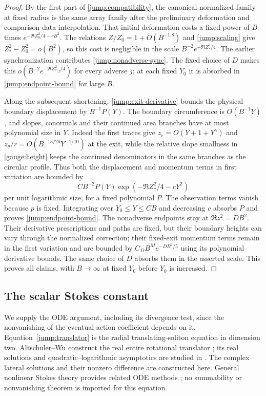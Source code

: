 \begin{proof}
By the first part of \cref{jump:compatibility}, the canonical
normalized family at fixed radius is the same array family after
the preliminary deformation and comparison-data interpolation.
That initial deformation costs a fixed power of $B$ times
$e^{-\Re Z_0^2/4-cB^2}$.  The relations
$Z/Z_0=1+O(B^{-1.8})$ and \eqref{jump:scaling} give
$Z_*^2-Z_0^2=o(B^2)$, so this cost is negligible in the
scale $B^{-2}e^{-\Re Z_*^2/4}$.
The earlier synchronization contributes
\eqref{jump:nonadverse-sync}.  The fixed choice of $D$ makes this
$o(B^{-2}e^{-\Re Z_{*,j}^2/4})$ for every adverse $j$; at each fixed
$Y_0$ it is absorbed in \eqref{jump:endpoint-bound} for large $B$.

Along the subsequent shortening, \eqref{jump:exit-derivative}
bounds the physical boundary displacement by $B^{-1}P(Y)$.
The boundary circumference is $O(B^{-1}Y)$, and slopes,
conormals and their continued area branches have at most
polynomial size in $Y$.  Indeed the first traces give
$z_r=O(Y+1+Y^\gamma)$ and
$z_\theta/r=O(B^{-13/20}Y^{-1/10})$ at the exit, while the
relative slope smallness in \cref{gauge:height} keeps the
continued denominators in the same branches as the circular
profile.
Thus both the displacement and momentum terms in first variation
are bounded by
\[
 CB^{-2}P(Y)\exp(-\Re Z_*^2/4-cY^2)
\]
per unit logarithmic size, for a fixed polynomial $P$.  The
observation terms vanish because $p$ is fixed.  Integrating
over $Y_0\leq Y\leq CB$ and decreasing $c$ absorbs $P$ and proves
\eqref{jump:endpoint-bound}.  The nonadverse endpoints stay at
$\Re z^2=DB^2$.  Their derivative prescriptions and paths are fixed,
but their boundary heights can vary through the normalized correction;
their fixed-exit momentum terms remain in the first variation and are
bounded by $C_D B^M e^{-DB^2/5}$ using its polynomial derivative bounds.
The same choice of $D$ absorbs them in the asserted scale.  This proves all
claims, with $B\to\infty$ at fixed $Y_0$ before $Y_0$ is increased.
\end{proof}

\subsection{The scalar Stokes constant}

We supply the ODE argument, including its divergence test, since
the nonvanishing of the eventual action coefficient depends on it.
Equation~\eqref{jump:translator} is the radial translating-soliton
equation in dimension two.  Altschuler--Wu construct the real entire
rotational translator \cite[Corollary~3.3]{AW1994}; its real solutions and quadratic--logarithmic
asymptotics are studied in \cite[Section~2, equation~(2.1) and
Lemmas~2.1--2.2]{CSS2007}.  The complex lateral solutions and their
nonzero difference are constructed here.  General nonlinear Stokes
theory provides related ODE methods \cite{Costin1998}; no summability
or nonvanishing theorem is imported for this equation.

